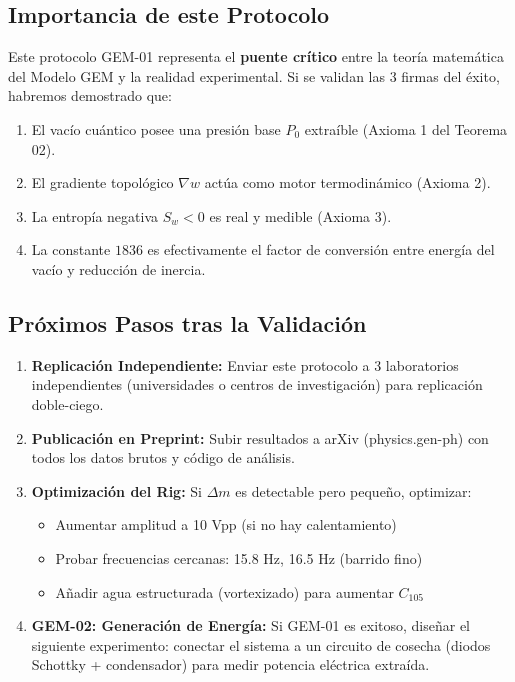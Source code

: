 \documentclass[12pt, a4paper]{article}
\begin{document}
\subsection{Importancia de este Protocolo}

Este protocolo GEM-01 representa el \textbf{puente crítico} entre la teoría matemática del Modelo GEM y la realidad experimental. Si se validan las 3 firmas del éxito, habremos demostrado que:

\begin{enumerate}
    \item El vacío cuántico posee una presión base $P_0$ extraíble (Axioma 1 del Teorema 02).
    \item El gradiente topológico $\nabla w$ actúa como motor termodinámico (Axioma 2).
    \item La entropía negativa $S_w < 0$ es real y medible (Axioma 3).
    \item La constante $1836$ es efectivamente el factor de conversión entre energía del vacío y reducción de inercia.
\end{enumerate}

\subsection{Próximos Pasos tras la Validación}

\begin{enumerate}
    \item \textbf{Replicación Independiente:} Enviar este protocolo a 3 laboratorios independientes (universidades o centros de investigación) para replicación doble-ciego.
    
    \item \textbf{Publicación en Preprint:} Subir resultados a arXiv (physics.gen-ph) con todos los datos brutos y código de análisis.
    
    \item \textbf{Optimización del Rig:} Si $\Delta m$ es detectable pero pequeño, optimizar:
    \begin{itemize}
        \item Aumentar amplitud a 10 Vpp (si no hay calentamiento)
        \item Probar frecuencias cercanas: 15.8 Hz, 16.5 Hz (barrido fino)
        \item Añadir agua estructurada (vortexizado) para aumentar $C_{105}$
    \end{itemize}
    
    \item \textbf{GEM-02: Generación de Energía:} Si GEM-01 es exitoso, diseñar el siguiente experimento: conectar el sistema a un circuito de cosecha (diodos Schottky + condensador) para medir potencia eléctrica extraída.
\end{enumerate}
\end{document}
